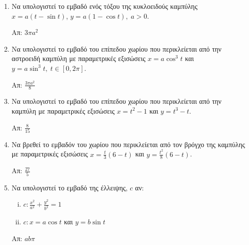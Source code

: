 \begin{enumerate}
  \item Να υπολογιστεί το εμβαδό ενός τόξου της κυκλοειδούς καμπύλης 
    $ x = a(t - \sin{t}) $, $ y = a(1 - \cos{t}), \; a>0 $.

    \hfill Απ: $3 \pi a^{2} $

  \item Να υπολογιστεί το εμβαδό του επίπεδου χωρίου που περικλείεται από την 
    αστροειδή καμπύλη με παραμετρικές εξισώσεις $ x = a \cos^{3}{t}  $ και 
    $ y = a \sin^{3}{t}, \; t \in [0, 2 \pi] $.

    \hfill Απ: $ \frac{3 \pi a^{2}}{8} $ 

  \item Να υπολογιστεί το εμβαδό του επίπεδου χωρίου που περικλείεται από την 
    καμπύλη με παραμετρικές εξισώσεις $ x = t^{2} - 1 $ και $ y = t^{3} - t $.

    \hfill Απ: $ \frac{8}{15} $ 

  \item Να βρεθεί το εμβαδόν του χωρίου που περικλείεται από τον βρόγχο της καμπύλης 
    με παραμετρικές εξισώσεις $ x= \frac{t}{3} (6-t) $ και $ y= \frac{t^{2}}{8} (6-t) $.

    \hfill Απ: $ \frac{27}{5} $ 

  \item Να υπολογιστεί το εμβαδό της έλλειψης, $c$ αν:
    \begin{enumerate}[i)]
      \item $ c: \frac{x^{2}}{a^{2}} + \frac{y^{2}}{b^{2}} = 1 $ 
      \item $ c: x = a \cos{t}$ και $ y = b \sin{t} $ 
    \end{enumerate}

    \hfill Απ: $ ab \pi $ 
\end{enumerate}





